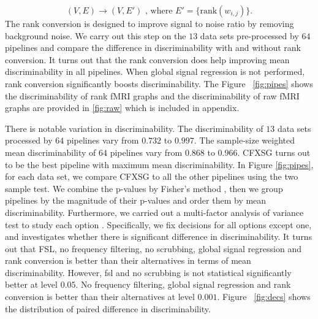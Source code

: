 \documentclass{article}
\begin{document}
\[(V,E) \rightarrow (V,E') \text{ , where } E'= \{\text{rank}(w_{i,j})\} .\]
The rank conversion is designed to improve signal to noise ratio by removing background noise. We carry out this step on the $13$ data sets pre-processed by $64$ pipelines and compare the difference in discriminability with and without rank conversion. It turns out that the rank conversion does help improving mean discriminability in all pipelines. When global signal regression is not performed, rank conversion significantly boosts discriminability. The Figure ~\ref{fig:pipes} shows the discriminability of rank fMRI graphs and the discriminability of raw fMRI graphs are provided in \ref{fig:raw} which is included in appendix. 

There is notable variation in discriminability. The discriminability of $13$ data sets processed by $64$ pipelines vary from $0.732$ to $0.997$. The sample-size weighted mean discriminability of  $64$ pipelines vary from $0.868$ to $0.966$. CFXSG turns out to be the best pipeline with maximum mean discriminability. In Figure \ref{fig:pipes}, for each data set, we compare CFXSG to all the other pipelines using the two sample test. We combine the p-values by Fisher's method \cite{fisher1925statistical}, then we group pipelines by the magnitude of their p-values and order them by mean discriminability. Furthermore, we carried out a multi-factor analysis of variance test to study each option \cite{hair2009multivariate}. Specifically, we fix decisions for all options except one, and investigates whether there is significant difference in discriminability. It turns out that FSL, no frequency filtering, no scrubbing, global signal regression and rank conversion is better than their alternatives in terms of mean discriminability. However, fsl and no scrubbing is not statistical significantly better at level $0.05$. No frequency filtering, global signal regression and rank conversion is better than their alternatives at level $0.001$. Figure ~\ref{fig:decs} shows the distribution of paired difference in discriminability.
 
\end{document}

